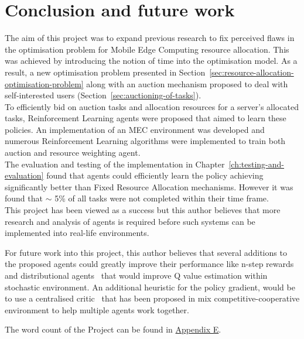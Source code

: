 \chapter{Conclusion and future work}
\label{ch:conclusion-and-future-work}
The aim of this project was to expand previous research to fix perceived flaws in the optimisation problem for
Mobile Edge Computing resource allocation. This was achieved by introducing the notion of time into the optimisation
model. As a result, a new optimisation problem presented in Section~\ref{sec:resource-allocation-optimisation-problem}
along with an auction mechanism proposed to deal with self-interested users (Section~\ref{sec:auctioning-of-tasks}). \\
To efficiently bid on auction tasks and allocation resources for a server's allocated tasks, Reinforcement Learning
agents were proposed that aimed to learn these policies. An implementation of an MEC environment was developed and
numerous Reinforcement Learning algorithms were implemented to train both auction and resource weighting agent. \\
The evaluation and testing of the implementation in Chapter~\ref{ch:testing-and-evaluation} found that agents could
efficiently learn the policy achieving significantly better than Fixed Resource Allocation mechanisms.
However it was found that $\sim$ 5\% of all tasks were not completed within their time frame. \\
This project has been viewed as a success but this author believes that more research and analysis of agents is
required before such systems can be implemented into real-life environments.

For future work into this project, this author believes that several additions to the proposed agents could greatly
improve their performance like n-step rewards~\citep{multi-step-dqn} and distributional
agents~\citep{distributional_dqn} that would improve Q value estimation within stochastic environment. An additional
heuristic for the policy gradient, would be to use a centralised critic~\citep{maddpg} that has been proposed in mix
competitive-cooperative environment to help multiple agents work together.

The word count of the Project can be found in \hyperref[app:project-management]{Appendix E}.
